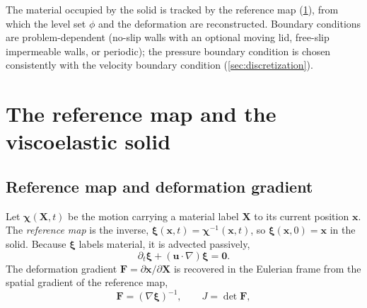 \documentclass[final,3p,times]{elsarticle}
\theoremstyle{remark}
\newcommand{\uv}{\bm{u}}                 %
\newcommand{\xv}{\bm{x}}                 %
\newcommand{\Xv}{\bm{X}}                 %
\newcommand{\xiv}{\bm{\xi}}              %
\newcommand{\Ften}{\bm{F}}              %
\newcommand{\grad}{\nabla}
\begin{document}
The material occupied by the solid is tracked by the reference map (\cref{sec:rmt}),
from which the level set $\phi$ and the deformation are reconstructed. Boundary
conditions are problem-dependent (no-slip walls with an optional moving lid, free-slip
impermeable walls, or periodic); the pressure boundary condition is chosen consistently
with the velocity boundary condition (\cref{sec:discretization}).

\section{The reference map and the viscoelastic solid}
\label{sec:rmt}

\subsection{Reference map and deformation gradient}
Let $\bm\chi(\Xv,t)$ be the motion carrying a material label $\Xv$ to its current
position $\xv$. The \emph{reference map} is the inverse,
$\xiv(\xv,t)=\bm\chi^{-1}(\xv,t)$, so $\xiv(\xv,0)=\xv$ in the solid. Because $\xiv$
labels material, it is advected passively,
\begin{equation}
\partial_t\xiv + (\uv\!\cdot\!\grad)\xiv = \bm 0 .
\label{eq:xi-advect}
\end{equation}
The deformation gradient $\Ften=\partial\xv/\partial\Xv$ is recovered in the Eulerian
frame from the spatial gradient of the reference map,
\begin{equation}
\Ften = (\grad\xiv)^{-1},
\qquad J=\det\Ften ,
\label{eq:F}
\end{equation}
\end{document}
